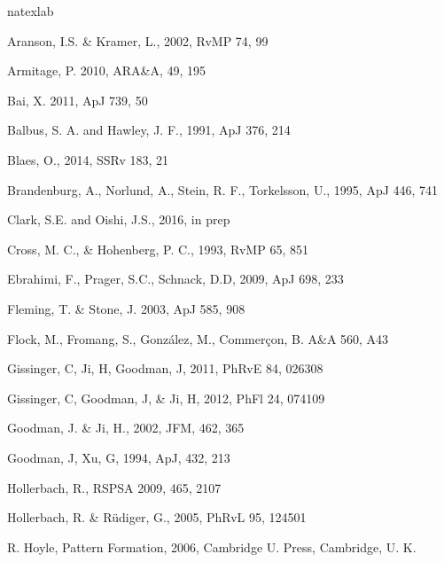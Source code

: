 \documentclass{emulateapj}
\begin{document}


\begin{thebibliography}{53}
\expandafter\ifx\csname natexlab\endcsname\relax\def\natexlab#1{#1}\fi

Aranson, I.S. \& Kramer, L., 2002, RvMP 74, 99

Armitage, P. 2010, ARA\&A, 49, 195

Bai, X. 2011, ApJ 739, 50

Balbus, S. A. and Hawley, J. F., 1991, ApJ 376, 214

Blaes, O., 2014, SSRv 183, 21

Brandenburg, A., Norlund, A., Stein, R. F., Torkelsson, U., 1995, ApJ 446, 741 

Clark, S.E. and Oishi, J.S., 2016, in prep

Cross, M. C., \& Hohenberg, P. C., 1993, RvMP 65, 851

Ebrahimi, F., Prager, S.C., Schnack, D.D, 2009, ApJ 698, 233

Fleming, T. \& Stone, J. 2003, ApJ 585, 908

Flock, M., Fromang, S., Gonz\'alez, M., Commer\c{c}on, B. A\&A 560, A43

Gissinger, C, Ji, H, Goodman, J, 2011, PhRvE 84, 026308

Gissinger, C, Goodman, J, \& Ji, H, 2012, PhFl 24, 074109

Goodman, J. \& Ji, H., 2002, JFM, 462, 365

Goodman, J, Xu, G, 1994, ApJ, 432, 213

Hollerbach, R., RSPSA 2009, 465, 2107

Hollerbach, R. \& R\"udiger, G., 2005, PhRvL 95, 124501

R. Hoyle, Pattern Formation, 2006, Cambridge U. Press, Cambridge,
U. K.


\end{thebibliography}
\end{document}
